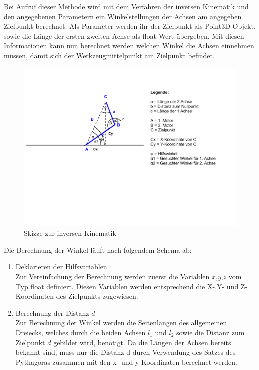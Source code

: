 \begin{itemize}
Bei Aufruf dieser Methode wird mit dem Verfahren der inversen Kinematik und den angegebenen Parametern ein Winkelstellungen der Achsen am angegeben Zielpunkt berechnet. Als Parameter werden ihr der Zielpunkt als Point3D-Objekt, sowie die Länge der ersten zweiten Achse als float-Wert übergeben. Mit diesen Informationen kann nun berechnet werden welchen Winkel die Achsen einnehmen müssen, damit  sich der Werkzeugmittelpunkt am Zielpunkt befindet.\\
\begin{figure}[H]
  \centering
  \begin{minipage}[t]{12 cm}
  	\centering
  	\includegraphics[width=12cm]{images/Inverskinematik} 
    \caption{Skizze zur inversen Kinematik}
  \end{minipage}
\end{figure}
Die Berechnung der Winkel läuft nach folgendem Schema ab:
\begin{enumerate}
\item Deklarieren der Hilfsvariablen\\
Zur Vereinfachung der Berechnung werden zuerst die Variablen $x$,$y$,$z$ vom Typ float definiert. Diesen Variablen werden entsprechend die X-,Y- und Z-Koordinaten des Zielpunkts zugewiesen.
\item Berechnung der Distanz $d$\\
Zur Berechnung der Winkel werden die Seitenlängen des allgemeinen Dreiecks, welches durch die beiden Achsen $l_1$ und $l_2$ sowie die Distanz zum Zielpunkt $d$ gebildet wird, benötigt. Da die Längen der Achsen bereits bekannt sind, muss nur die Distanz d durch Verwendung des Satzes des Pythagoras zusammen mit den x- und y-Koordinaten berechnet werden.\\

\end{enumerate}
\end{itemize}
